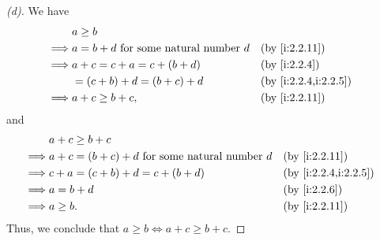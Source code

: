 \begin{proof}[(d)]
  We have
  \begin{align*}
             & a \geq b                                                               \\
    \implies & a = b + d \text{ for some natural number } d &  & \by{i:2.2.11}        \\
    \implies & a + c = c + a = c + (b + d)                  &  & \by{i:2.2.4}         \\
             & = (c + b) + d = (b + c) + d                  &  & \by{i:2.2.4,i:2.2.5} \\
    \implies & a + c \geq b + c,                            &  & \by{i:2.2.11}
  \end{align*}
  and
  \begin{align*}
             & a + c \geq b + c                                                                 \\
    \implies & a + c = (b + c) + d \text{ for some natural number } d &  & \by{i:2.2.11}        \\
    \implies & c + a = (c + b) + d = c + (b + d)                      &  & \by{i:2.2.4,i:2.2.5} \\
    \implies & a = b + d                                              &  & \by{i:2.2.6}         \\
    \implies & a \geq b.                                              &  & \by{i:2.2.11}
  \end{align*}
  Thus, we conclude that \(a \geq b \iff a + c \geq b + c\).
\end{proof}

